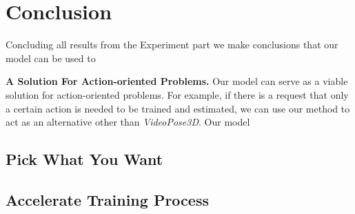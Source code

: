 \documentclass[10pt,twocolumn,letterpaper]{article}
\begin{document}
\section{Conclusion}

Concluding all results from the Experiment part we make conclusions that our model can be used to 

\textbf{A Solution For Action-oriented Problems.}
Our model can serve as a viable solution for action-oriented problems. For example, if there is a request that only a certain action is needed to be trained
and estimated, we can use our method to act as an alternative other than \textit{VideoPose3D}. Our model 

\subsection{Pick What You Want}

\subsection{Accelerate Training Process}

\newpage

{\small


}
\end{document}
